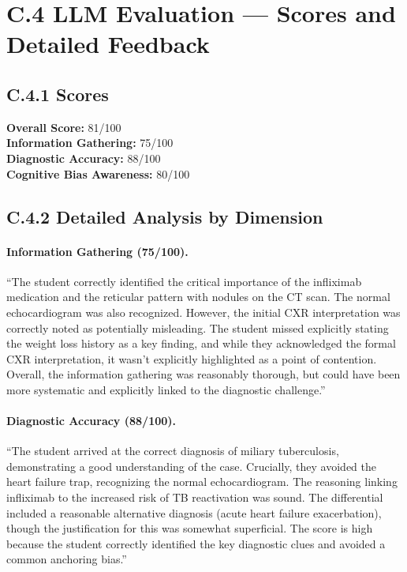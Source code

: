 \section*{C.4 \quad LLM Evaluation — Scores and Detailed Feedback}
\label{app:session_s6:llm}

\subsection*{C.4.1 \quad Scores}
\noindent
\textbf{Overall Score:} 81/100 \\
\textbf{Information Gathering:} 75/100 \\
\textbf{Diagnostic Accuracy:} 88/100 \\
\textbf{Cognitive Bias Awareness:} 80/100

\subsection*{C.4.2 \quad Detailed Analysis by Dimension}

\paragraph{Information Gathering (75/100).}
``The student correctly identified the critical importance of the infliximab medication and the reticular pattern with nodules on the CT scan. The normal echocardiogram was also recognized. However, the initial CXR interpretation was correctly noted as potentially misleading. The student missed explicitly stating the weight loss history as a key finding, and while they acknowledged the formal CXR interpretation, it wasn't explicitly highlighted as a point of contention. Overall, the information gathering was reasonably thorough, but could have been more systematic and explicitly linked to the diagnostic challenge.''

\paragraph{Diagnostic Accuracy (88/100).}
``The student arrived at the correct diagnosis of miliary tuberculosis, demonstrating a good understanding of the case. Crucially, they avoided the heart failure trap, recognizing the normal echocardiogram. The reasoning linking infliximab to the increased risk of TB reactivation was sound. The differential included a reasonable alternative diagnosis (acute heart failure exacerbation), though the justification for this was somewhat superficial. The score is high because the student correctly identified the key diagnostic clues and avoided a common anchoring bias.''

